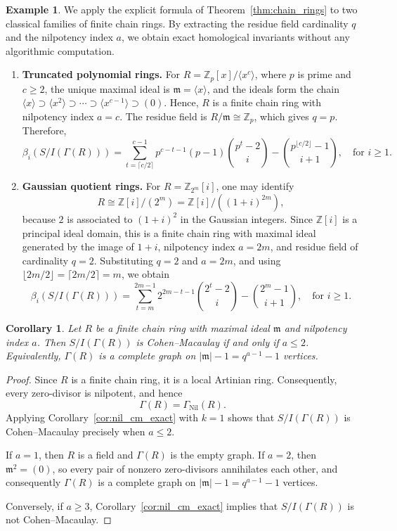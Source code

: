 \documentclass[12pt, reqno]{amsart}
\newtheorem{corollary}[theorem]{Corollary}
\theoremstyle{definition}
\newtheorem{example}[theorem]{Example}
\numberwithin{equation}{section}
\begin{document}
	\begin{example}
		We apply the explicit formula of Theorem~\ref{thm:chain_rings} to two classical families of finite chain rings. By extracting the residue field cardinality $q$ and the nilpotency index $a$, we obtain exact homological invariants without any algorithmic computation.
		
		\begin{enumerate}
			\item \textbf{Truncated polynomial rings.}
			For $R=\mathbb Z_p[x]/\langle x^c \rangle$, where $p$ is prime and $c\ge 2$, the unique maximal ideal is $\mathfrak m=\langle x\rangle$, and the ideals form the chain $\langle x\rangle \supset \langle x^2\rangle \supset \cdots \supset \langle x^{c-1}\rangle \supset (0)$. Hence, $R$ is a finite chain ring with nilpotency index $a=c$. The residue field is $R/\mathfrak{m} \cong \mathbb Z_p$, which gives $q = p$. Therefore,
			\[
			\beta_i(S/I(\Gamma(R))) = \sum_{t=\lceil c/2 \rceil}^{c-1} p^{c-t-1}(p-1) \binom{p^t - 2}{i} - \binom{p^{\lfloor c/2 \rfloor} - 1}{i+1}, \quad \text{for } i \ge1.
			\]
			
			\item \textbf{Gaussian quotient rings.}
			For $R=\mathbb Z_{2^m}[i]$, one may identify
\[
R\cong \mathbb Z[i]/(2^m)=\mathbb Z[i]/((1+i)^{2m}),
\]
because $2$ is associated to $(1+i)^2$ in the Gaussian integers.  Since $\mathbb Z[i]$ is a principal ideal domain, this is a finite chain ring with maximal ideal generated by the image of $1+i$, nilpotency index $a=2m$, and residue field of cardinality $q=2$.
			Substituting $q=2$ and $a=2m$, and using $\lfloor 2m/2 \rfloor = \lceil 2m/2 \rceil = m$, we obtain
			\[
			\beta_i(S/I(\Gamma(R))) = \sum_{t=m}^{2m-1} 2^{2m-t-1} \binom{2^t - 2}{i} - \binom{2^m - 1}{i+1}, \quad \text{for } i \ge1.
			\]
		\end{enumerate}
	\end{example}
	
	\begin{corollary}\label{cor:chain_cm_exact}
		Let $R$ be a finite chain ring with maximal ideal $\mathfrak{m}$ and nilpotency index $a$. Then $S/I(\Gamma(R))$ is Cohen--Macaulay if and only if $a\le 2$. Equivalently, $\Gamma(R)$ is a complete graph on $|\mathfrak{m}| - 1 = q^{a-1} - 1$ vertices.
	\end{corollary}
	
	\begin{proof}
		Since $R$ is a finite chain ring, it is a local Artinian ring. Consequently, every zero-divisor is nilpotent, and hence
		\[
		\Gamma(R)=\Gamma_{\operatorname{Nil}}(R).
		\]
		Applying Corollary~\ref{cor:nil_cm_exact} with $k=1$ shows that $S/I(\Gamma(R))$ is Cohen--Macaulay precisely when $a\le 2$.
		
		If $a=1$, then $R$ is a field and $\Gamma(R)$ is the empty graph. If $a=2$, then $\mathfrak m^2=(0)$, so every pair of nonzero zero-divisors annihilates each other, and consequently $\Gamma(R)$ is a complete graph on $|\mathfrak{m}| - 1 = q^{a-1} - 1$ vertices.
		
		Conversely, if $a\ge 3$, Corollary~\ref{cor:nil_cm_exact} implies that $S/I(\Gamma(R))$ is not Cohen--Macaulay.
	\end{proof}
	
\end{document}
